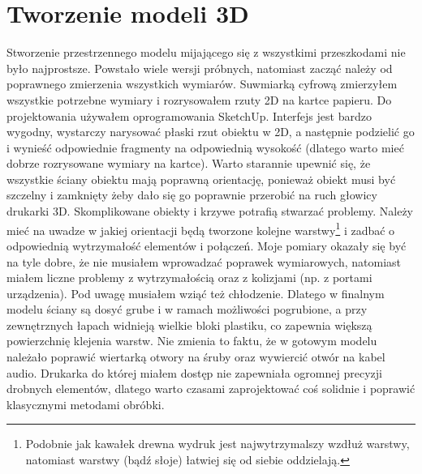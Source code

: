 \documentclass[declaration,shortabstract, inz]{iithesis}
\begin{document}
\section{Tworzenie modeli 3D}
\label{section:3d}
    Stworzenie przestrzennego modelu mijającego się z wszystkimi przeszkodami nie było najprostsze. Powstało wiele wersji próbnych, natomiast zacząć należy od poprawnego zmierzenia wszystkich wymiarów. Suwmiarką cyfrową zmierzyłem wszystkie potrzebne wymiary i rozrysowałem rzuty 2D na kartce papieru. Do projektowania używałem oprogramowania SketchUp. Interfejs jest bardzo wygodny, wystarczy narysować płaski rzut obiektu w 2D, a następnie podzielić go i wynieść odpowiednie fragmenty na odpowiednią wysokość (dlatego warto mieć dobrze rozrysowane wymiary na kartce). Warto starannie upewnić się, że wszystkie ściany obiektu mają poprawną orientację, ponieważ obiekt musi być szczelny i zamknięty żeby dało się go poprawnie przerobić na ruch głowicy drukarki 3D. Skomplikowane obiekty i krzywe potrafią stwarzać problemy. Należy mieć na uwadze w jakiej orientacji będą tworzone kolejne warstwy\footnote{Podobnie jak kawałek drewna wydruk jest najwytrzymalszy wzdłuż warstwy, natomiast warstwy (bądź słoje) łatwiej się od siebie oddzielają.} i zadbać o odpowiednią wytrzymałość elementów i połączeń. Moje pomiary okazały się być na tyle dobre, że nie musiałem wprowadzać poprawek wymiarowych, natomiast miałem liczne problemy z wytrzymałością oraz z kolizjami (np. z portami urządzenia). Pod uwagę musiałem wziąć też chłodzenie. Dlatego w finalnym modelu ściany są dosyć grube i w ramach możliwości pogrubione, a przy zewnętrznych łapach widnieją wielkie bloki plastiku, co zapewnia większą powierzchnię klejenia warstw. Nie zmienia to faktu, że w gotowym modelu należało poprawić wiertarką otwory na śruby oraz wywiercić otwór na kabel audio. Drukarka do której miałem dostęp nie zapewniała ogromnej precyzji drobnych elementów, dlatego warto czasami zaprojektować coś solidnie i poprawić klasycznymi metodami obróbki.
\end{document}
